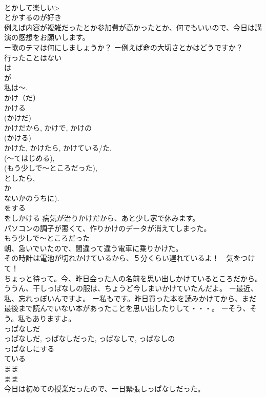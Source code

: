 \documentclass[8pt]{extreport}
\begin{document}
\begin{CJK}{UTF8}{min}
\\	とかして楽しい>
\\	とかするのが好き 
\\	例えば内容が複雑だったとか参加費が高かったとか、何でもいいので、今日は講演の感想をお願いします。 
\\	ー歌のテマは何にしましょうか？ ー例えば命の大切さとかはどうですか？
\\	行ったことはない	
\\	は 
\\	が 
\\	私は～.
\\	かけ（だ） 
\\	かける	
\\	(かけだ) 
\\	かけだから, かけで, かけの
\\	(かける) 
\\	かけた, かけたら, かけている/た. 
\\	(～てはじめる), 
\\	(もう少しで～ところだった), 
\\	としたら, 
\\	か
\\	ないかのうちに). 
\\	をする 
\\	をしかける 病気が治りかけだから、あと少し家で休みます。 
\\	パソコンの調子が悪くて、作りかけのデータが消えてしまった。 
\\	もう少しで～ところだった 
\\	朝、急いでいたので、間違って違う電車に乗りかけた。 
\\	その時計は電池が切れかけているから、５分くらい遅れているよ！　気をつけて！ 
\\	ちょっと待って。今、昨日会った人の名前を思い出しかけているところだから。 
\\	ううん、干しっぱなしの服は、ちょうど今しまいかけていたんだよ。 ー最近、私、忘れっぽいんですよ。 ー私もです。昨日買った本を読みかけてから、まだ最後まで読んでいない本があったことを思い出したりして・・・。 ーそう、そう。私もありますよ。
\\	っぱなしだ	
\\	っぱなしだ, っぱなしだった, っぱなしで, っぱなしの
\\	っぱなしにする 
\\	ている 
\\	まま 
\\	まま 
\\	今日は初めての授業だったので、一日緊張しっぱなしだった。 

\end{CJK}
\end{document}
